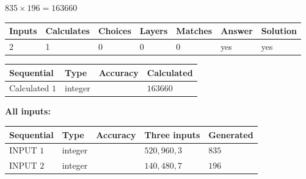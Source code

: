 \documentclass{ctexart}
\begin{document}
 
\noindent{}
 
 

 
 
 
\noindent{}
 
 

$ %
835 \times  %
196=   %
163660$
 
 
\noindent{}
 
 

 
   
   
   
   
\noindent\begin{tabular}{|l|l|l|l|l|l|l|}
 \hline
Inputs & Calculates & Choices & Layers & Matches & Answer & Solution \\ \hline
 2  & 
 1  & 
 0
  & 
 0  & 
 0  & 
  yes & 
  yes 
  \\ \hline
 \end{tabular}
   
   
   
   
\noindent{}
   
   
  
  
\noindent\begin{tabular}{|l|l|l|l|}
\hline
 Sequential & Type & Accuracy & Calculated \\ 
\hline
 
 
  Calculated $  1 $ & integer &  & 
  $ 163660 $ 
 \\  \hline  
 \end{tabular}
   
   
   
   
\noindent\vspace{0.1in}\hspace{-0.08in} {\textbf{\Large{All inputs: }}}
   
   
  
  
\noindent\begin{tabular}{|l|l|l|l|l|}
\hline
 Sequential & Type & Accuracy & Three inputs & Generated \\ 
\hline
 
 
  INPUT $  1 $ & integer &  & $
 520
 , 
 960
 , 
 3
 $ & $ 835 $ 
 \\  \hline  
 
 
  INPUT $  2 $ & integer &  & $
 140
 , 
 480
 , 
 7
 $ & $ 196 $ 
 \\  \hline  
 \end{tabular}
   
\end{document}
